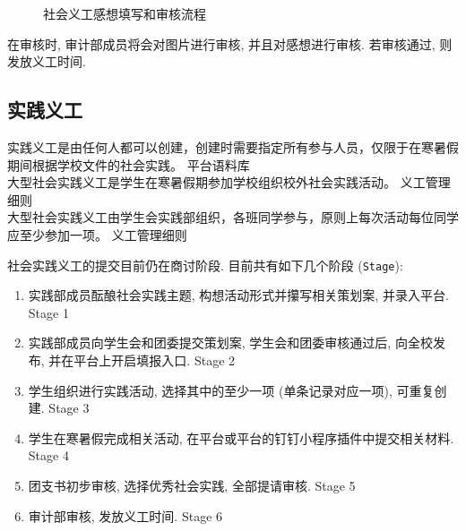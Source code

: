 \documentclass{article}
\begin{document}
\begin{figure}[H]
  \centering
  \caption{社会义工感想填写和审核流程}
\end{figure}

在审核时, 审计部成员将会对图片进行审核, 并且对感想进行审核. 若审核通过, 则发放义工时间.

\subsection{实践义工}

\begin{mdframed}
  \fangsong
  实践义工是由任何人都可以创建，创建时需要指定所有参与人员，仅限于在寒暑假期间根据学校文件的社会实践。 \hfill 平台语料库 \\
  大型社会实践义工是学生在寒暑假期参加学校组织校外社会实践活动。 \hfill 义工管理细则 \\
  大型社会实践义工由学生会实践部组织，各班同学参与，原则上每次活动每位同学应至少参加一项。 \hfill 义工管理细则
\end{mdframed}

社会实践义工的提交目前仍在商讨阶段. 目前共有如下几个阶段 (\texttt{Stage}):

\begin{enumerate}
  \item 实践部成员酝酿社会实践主题, 构想活动形式并攥写相关策划案, 并录入平台. \hfill Stage 1
  \item 实践部成员向学生会和团委提交策划案, 学生会和团委审核通过后, 向全校发布, 并在平台上开启填报入口. \hfill Stage 2
  \item 学生组织进行实践活动, 选择其中的至少一项 (单条记录对应一项), 可重复创建. \hfill Stage 3
  \item 学生在寒暑假完成相关活动, 在平台或平台的钉钉小程序插件中提交相关材料. \hfill Stage 4
  \item 团支书初步审核, 选择优秀社会实践, 全部提请审核. \hfill Stage 5
  \item 审计部审核, 发放义工时间. \hfill Stage 6
\end{enumerate}
\end{document}
